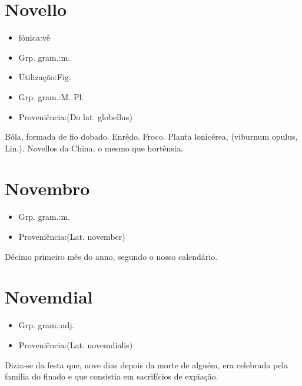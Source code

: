 \section{Novello}
\begin{itemize}
\item {fónica:vê}
\end{itemize}
\begin{itemize}
\item {Grp. gram.:m.}
\end{itemize}
\begin{itemize}
\item {Utilização:Fig.}
\end{itemize}
\begin{itemize}
\item {Grp. gram.:M. Pl.}
\end{itemize}
\begin{itemize}
\item {Proveniência:(Do lat. \textunderscore globellus\textunderscore )}
\end{itemize}
Bóla, formada de fio dobado.
Enrêdo.
Froco.
Planta lonicérea, (\textunderscore viburnum opulus\textunderscore , Lin.).
\textunderscore Novellos da China\textunderscore , o mesmo que \textunderscore hortênsia\textunderscore .
\section{Novembro}
\begin{itemize}
\item {Grp. gram.:m.}
\end{itemize}
\begin{itemize}
\item {Proveniência:(Lat. \textunderscore november\textunderscore )}
\end{itemize}
Décimo primeiro mês do anno, segundo o nosso calendário.
\section{Novemdial}
\begin{itemize}
\item {Grp. gram.:adj.}
\end{itemize}
\begin{itemize}
\item {Proveniência:(Lat. \textunderscore novemdialis\textunderscore )}
\end{itemize}
Dizia-se da festa que, nove dias depois da morte de alguém, era celebrada pela família do finado e que consistia em sacrifícios de expiação.
